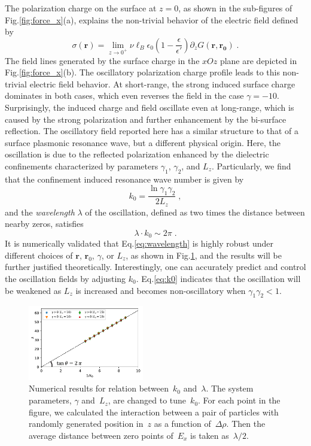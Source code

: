 \documentclass[aps,prl,reprint,showpacs,floatfix,superscriptaddress]{revtex4-2}
\newcommand{\V}[1]{\boldsymbol{#1}} %
\newcommand{\D}[1]{\Delta#1} %
\newcommand{\eps}{\epsilon}
\begin{document}
The polarization charge on the surface at $z=0$, as shown in the sub-figures of Fig.\ref{fig:force_x}(a), explains the non-trivial behavior of the electric field defined by \begin{equation}
    \sigma(\V{r}) = \lim_{z \to 0^+} \nu \ell_B \eps_0  \left( 1 - \frac{\eps}{\eps'} \right) \partial_z G(\V{r}, \V{r_0})\;.
\end{equation}
The field lines generated by the surface charge in the $xOz$ plane are depicted in Fig.\ref{fig:force_x}(b). The oscillatory polarization charge profile leads to this non-trivial electric field behavior. 
At short-range, the strong induced surface charge dominates in both cases, which even reverses the field in the case $\gamma=-10$. 
Surprisingly, the induced charge and field oscillate even at long-range, which is caused by the strong polarization and further enhancement by the bi-surface reflection. 
The oscillatory field reported here has a similar structure to that of a surface plasmonic resonance wave, but a different physical origin. 
Here, the oscillation is due to the reflected polarization enhanced by the dielectric confinements characterized by parameters $\gamma_1$, $\gamma_2$, and $L_z$. 
Particularly, we find that the confinement induced resonance wave number is given by 
\begin{equation}\label{eq:k0}
    k_0 = \frac{\ln{\gamma_1 \gamma_2}}{2 L_z}\;,
\end{equation}
and the \emph{wavelength} $\lambda$ of the oscillation, defined as two times the distance between nearby zeros, satisfies
\begin{equation}\label{eq:wavelength}
    \lambda \cdot k_0 \sim 2 \pi \;.
\end{equation} 
It is numerically validated that Eq.\eqref{eq:wavelength} is highly robust under different choices of $\V{r}$, $\V{r}_0$, $\gamma$, or $L_z$, as shown in Fig.\ref{fig:k_wavelegth}, and the results will be further justified theoretically.
Interestingly, one can accurately predict and control the oscillation fields by adjusting $k_0$. Eq.\eqref{eq:k0} indicates that the oscillation will be weakened as $L_z$ is increased and becomes non-oscillatory when $\gamma_1\gamma_2<1$.

\begin{figure}[htbp]
    \centering
    \includegraphics[width=0.45\textwidth]{SIfig/k_wavelegth.pdf}
    \caption{
        Numerical results for relation between~$k_0$ and~$\lambda$.
        The system parameters, $\gamma$ and~$L_z$, are changed to tune~$k_0$.
        For each point in the figure, we calculated the interaction between a pair of particles with randomly generated position in~$z$ as a function of~$\D \rho$.
        Then the average distance between zero points of~$E_x$ is taken as~$\lambda / 2$.
    }
    \label{fig:k_wavelegth}
\end{figure}
\end{document}
